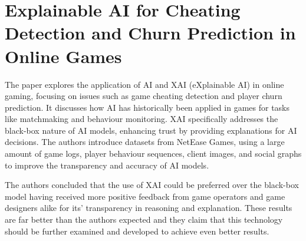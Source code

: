 \section{Explainable AI for Cheating Detection and Churn Prediction in Online Games \cite{tao2022explainable}}

The paper explores the application of AI and XAI (eXplainable AI) in online gaming, focusing on issues such as game cheating detection and player churn prediction. It discusses how AI has historically been applied in games for tasks like matchmaking and behaviour monitoring. XAI specifically addresses the black-box nature of AI models, enhancing trust by providing explanations for AI decisions. The authors introduce datasets from NetEase Games, using a large amount of game logs, player behaviour sequences, client images, and social graphs to improve the transparency and accuracy of AI models.

The authors concluded that the use of XAI could be preferred over the black-box model having received more positive feedback from game operators and game designers alike for its’ transparency in reasoning and explanation. These results are far better than the authors expected and they claim that this technology should be further examined and developed to achieve even better results.
